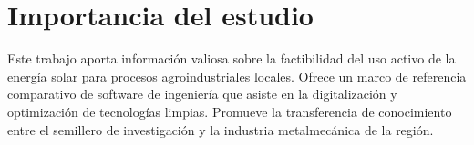 \section{Importancia del estudio}
\label{sec:cap01_importancia}

Este trabajo aporta información valiosa sobre la factibilidad del uso activo de la energía solar para procesos agroindustriales locales.
Ofrece un marco de referencia comparativo de software de ingeniería que asiste en la digitalización y optimización de tecnologías limpias.
Promueve la transferencia de conocimiento entre el semillero de investigación y la industria metalmecánica de la región.
